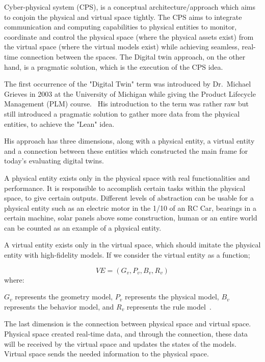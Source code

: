\documentclass[9pt,conference]{IEEEtran}
\begin{document}
    Cyber-physical system (CPS), is a conceptual architecture/approach which aims to conjoin the physical and virtual space tightly. 
    The CPS aims to integrate communication and computing capabilities to physical entities to monitor, coordinate and control the physical space (where the physical assets exist) from the virtual space (where the virtual models exist) while achieving seamless, real-time connection between the spaces.
    The Digital twin approach, on the other hand, is a pragmatic solution, which is the execution of the CPS idea.~\cite{TAOCHAPTER1}
    
    The first occurrence of the "Digital Twin" term was introduced by Dr.~Michael Grieves in 2003 at the University of Michigan while giving the Product Lifecycle Management (PLM) course.~\cite{DTGRIEVES}
    His introduction to the term was rather raw but still introduced a pragmatic solution to gather more data from the physical entities, to achieve the "Lean" idea.
    
    His approach has three dimensions, along with a physical entity, a virtual entity and a connection between these entities which constructed the main frame for today's evaluating digital twins.~\cite{DTGRIEVES}

    A physical entity exists only in the physical space with real functionalities and performance. It is responsible to accomplish certain tasks within the physical space, to give certain outputs.
    Different levels of abstraction can be usable for a physical entity such as an electric motor in the 1/10 of an RC Car, bearings in a certain machine, solar panels above some construction, human or an entire world can be counted as an example of a physical entity.

    A virtual entity exists only in the virtual space, which should imitate the physical entity with high-fidelity models. If we consider the virtual entity as a function;

    \begin{equation}\label{Formulated Entity Equation}
        VE = (G_v, P_v, B_v, R_v)
    \end{equation}
    where:
    
    $G_v$ represents the geometry model, $P_v$ represents the physical model, $B_v$ represents  the behavior model, and $R_v$ represents the rule model~\cite{DTGRIEVES}.
    
    The last dimension is the connection between physical space and virtual space. Physical space created real-time data, and through the connection, these data will be received by the virtual space 
    and updates the states of the models. Virtual space sends the needed information to the physical space. 
\end{document}
